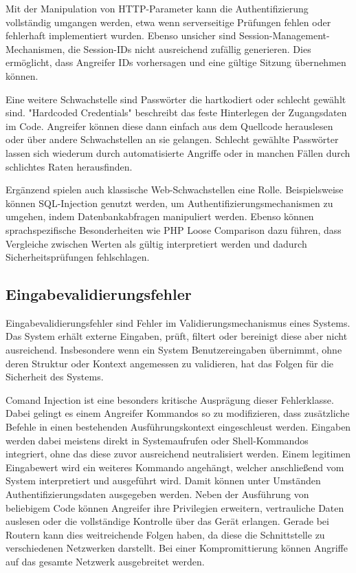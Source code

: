 	Mit der Manipulation von HTTP-Parameter kann die Authentifizierung vollständig umgangen werden, etwa wenn
	serverseitige Prüfungen fehlen oder fehlerhaft implementiert wurden. Ebenso unsicher sind Session-Management-Mechanismen, 
	die Session-IDs nicht ausreichend zufällig generieren. Dies ermöglicht, dass Angreifer IDs 
	vorhersagen und eine gültige Sitzung übernehmen können.

	Eine weitere Schwachstelle sind Passwörter die hartkodiert oder schlecht gewählt sind.
	"Hardcoded Credentials" beschreibt das feste Hinterlegen der Zugangsdaten im Code. Angreifer können diese
	dann einfach aus dem Quellcode herauslesen oder über andere Schwachstellen an sie gelangen.
	Schlecht gewählte Passwörter lassen sich wiederum durch automatisierte Angriffe oder in manchen Fällen
	durch schlichtes Raten herausfinden. 
	
	Ergänzend spielen auch klassische Web-Schwachstellen eine Rolle. Beispielsweise können SQL-Injection
	genutzt werden, um Authentifizierungsmechanismen zu umgehen, indem Datenbankabfragen manipuliert werden.
	Ebenso können sprachspezifische Besonderheiten wie PHP Loose Comparison dazu führen, dass Vergleiche
	zwischen Werten als gültig interpretiert werden und dadurch Sicherheitsprüfungen fehlschlagen.
	\cite{sessionmanagementowasp, cwecwe798use, cwecwe521weak, cwecwe89improper, bakhshi2024}

	\subsection{Eingabevalidierungsfehler}
	Eingabevalidierungsfehler sind Fehler im Validierungsmechanismus eines Systems. 
	Das System erhält externe Eingaben, prüft, filtert oder bereinigt diese aber nicht ausreichend.
	Insbesondere wenn ein System Benutzereingaben übernimmt, ohne deren Struktur oder Kontext angemessen
	zu validieren, hat das Folgen für die Sicherheit des Systems.

	Comand Injection ist eine besonders kritische Ausprägung dieser Fehlerklasse.
	Dabei gelingt es einem Angreifer Kommandos so zu modifizieren, dass zusätzliche Befehle in einen 
	bestehenden Ausführungskontext eingeschleust werden. Eingaben werden dabei meistens direkt in Systemaufrufen
	oder Shell-Kommandos integriert, ohne das diese zuvor ausreichend neutralisiert werden.
	Einem legitimen Eingabewert wird ein weiteres Kommando angehängt, welcher anschließend vom System interpretiert
	und ausgeführt wird. Damit können unter Umständen Authentifizierungsdaten ausgegeben werden.
	Neben der Ausführung von beliebigem Code können Angreifer ihre Privilegien erweitern, 
	vertrauliche Daten auslesen oder die vollständige Kontrolle über das Gerät erlangen.
	Gerade bei Routern kann dies weitreichende Folgen haben, da diese die Schnittstelle zu verschiedenen Netzwerken darstellt.
	Bei einer Kompromittierung können Angriffe auf das gesamte Netzwerk ausgebreitet werden.

